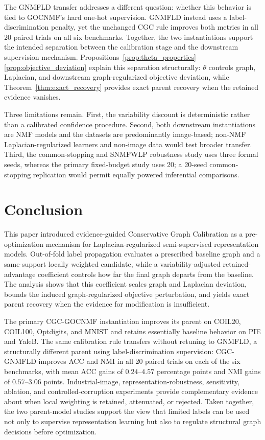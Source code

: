 \documentclass[11pt]{article}
\theoremstyle{remark}
\begin{document}
The GNMFLD transfer addresses a different question: whether this behavior is tied to GOCNMF's hard one-hot supervision. GNMFLD instead uses a label-discrimination penalty, yet the unchanged CGC rule improves both metrics in all 20 paired trials on all six benchmarks. Together, the two instantiations support the intended separation between the calibration stage and the downstream supervision mechanism. Propositions~\ref{prop:theta_properties}--\ref{prop:objective_deviation} explain this separation structurally: $\theta$ controls graph, Laplacian, and downstream graph-regularized objective deviation, while Theorem~\ref{thm:exact_recovery} provides exact parent recovery when the retained evidence vanishes.

Three limitations remain. First, the variability discount is deterministic rather than a calibrated confidence procedure. Second, both downstream instantiations are NMF models and the datasets are predominantly image-based; non-NMF Laplacian-regularized learners and non-image data would test broader transfer. Third, the common-stopping and SNMFWLP robustness study uses three formal seeds, whereas the primary fixed-budget study uses 20; a 20-seed common-stopping replication would permit equally powered inferential comparisons.

\section{Conclusion}
\label{sec:conclusion}

This paper introduced evidence-guided Conservative Graph Calibration as a pre-optimization mechanism for Laplacian-regularized semi-supervised representation models. Out-of-fold label propagation evaluates a prescribed baseline graph and a same-support locally weighted candidate, while a variability-adjusted retained-advantage coefficient controls how far the final graph departs from the baseline. The analysis shows that this coefficient scales graph and Laplacian deviation, bounds the induced graph-regularized objective perturbation, and yields exact parent recovery when the evidence for modification is insufficient.

The primary CGC-GOCNMF instantiation improves its parent on COIL20, COIL100, Optdigits, and MNIST and retains essentially baseline behavior on PIE and YaleB. The same calibration rule transfers without retuning to GNMFLD, a structurally different parent using label-discrimination supervision: CGC-GNMFLD improves ACC and NMI in all 20 paired trials on each of the six benchmarks, with mean ACC gains of $0.24$--$4.57$ percentage points and NMI gains of $0.57$--$3.06$ points. Industrial-image, representation-robustness, sensitivity, ablation, and controlled-corruption experiments provide complementary evidence about when local weighting is retained, attenuated, or rejected. Taken together, the two parent-model studies support the view that limited labels can be used not only to supervise representation learning but also to regulate structural graph decisions before optimization.
\end{document}
